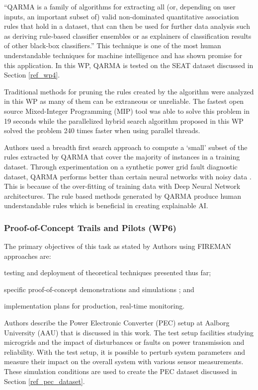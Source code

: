 \enquote{QARMA is a family of algorithms for extracting all (or, depending on user inputs, an important subset of) valid non-dominated quantitative association rules that hold in a dataset, that can then be used for further data analysis such as deriving rule-based classifier ensembles or as explainers of classification results of other black-box classifiers.}  This technique is one of the most human understandable techniques for machine intelligence and has shown promise for this application. In this WP, QARMA is tested on the SEAT dataset discussed in Section \ref{ref_wp4}.

Traditional methods for pruning the rules created by the algorithm were analyzed in this WP as many of them can be extraneous or unreliable. The fastest open source Mixed-Integer Programming (MIP) tool was able to solve this problem in 19 seconds while the parallelized hybrid search algorithm proposed in this WP solved the problem 240 times faster when using parallel threads.

Authors \cite{wp5.1} used a breadth first search approach to compute a `small' subset of the rules extracted by QARMA that cover the majority of instances in a training dataset. Through experimentation on a synthetic power grid fault diagnostic dataset, QARMA performs better than certain neural networks with noisy data \parencite{ml-performance-power-trans}. This is because of the over-fitting of training data with Deep Neural Network architectures. The rule based methods generated by QARMA produce human understandable rules which is beneficial in creating explainable AI.

\subsubsection{Proof-of-Concept Trails and Pilots (WP6)}
\label{ref_wp6}

The primary objectives of this task as stated by Authors \parencite{wp6.1} using FIREMAN approaches are:
\begin{inlinelist}
    \item testing and deployment of theoretical techniques presented thus far;
    \item specific proof-of-concept demonstrations and simulations ; and
    \item implementation plans for production, real-time monitoring.
\end{inlinelist}

Authors \parencite{wp6.3} describe the Power Electronic Converter (PEC) setup at Aalborg University (AAU) that is discussed in this work. The test setup facilities studying microgrids and the impact of disturbances or faults on power transmission and reliability. With the test setup, it is possible to perturb system parameters and measure their impact on the overall system with various sensor measurements. These simulation conditions are used to create the PEC dataset discussed in Section \ref{ref_pec_dataset}.

